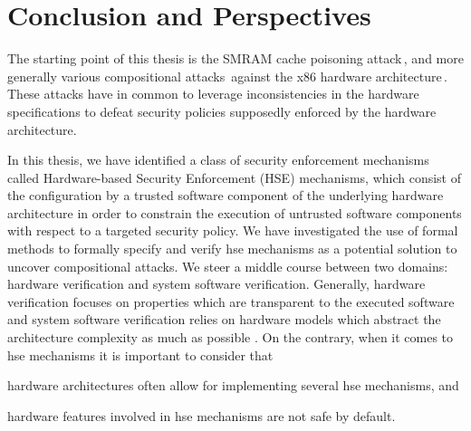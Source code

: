 \chapter{Conclusion and Perspectives}
\label{chapter:conclusion}


\vspace{1cm}%
\noindent
%
The starting point of this thesis is the SMRAM cache poisoning
attack\,\cite{duflot2009smram,wojtczuk2009smram}, and more generally various
compositional attacks\,\cite{wing2003compositionalattack} against the x86
hardware
architecture\,\cite{kovah2015senter,domas2015sinkhole,kallenberg2015racecondition}.
%
These attacks have in common to leverage inconsistencies in the hardware
specifications to defeat security policies supposedly enforced by the hardware
architecture.

In this thesis, we have identified a class of security enforcement mechanisms
called Hardware-based Security Enforcement (HSE) mechanisms, which consist of
the configuration by a trusted software component of the underlying hardware
architecture in order to constrain the execution of untrusted software
components with respect to a targeted security policy.
%
We have investigated the use of formal methods to formally specify and verify
\ac{hse} mechanisms as a potential solution to uncover compositional attacks.
%
We steer a middle course between two domains: hardware verification and system
software verification.
%
Generally, hardware verification focuses on properties which are transparent to
the executed software and system software verification relies on hardware models
which abstract the architecture complexity as much as possible .
%
On the contrary, when it comes to \ac{hse} mechanisms it is important to
consider that
%
\begin{inparaenum}[(1)]
\item \label{needreuse}%
  hardware architectures often allow for implementing several \ac{hse}
  mechanisms, and
\item \label{needreduce}%
  hardware features involved in \ac{hse} mechanisms are not safe by default.
\end{inparaenum}

